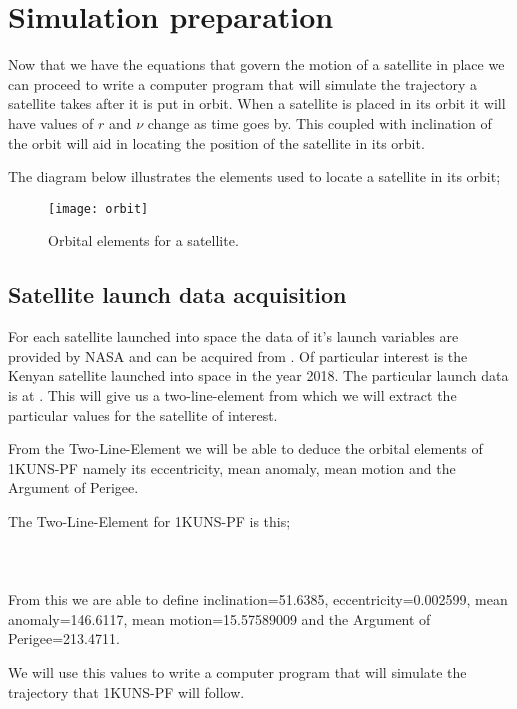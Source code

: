 \section{Simulation preparation}
Now that we have the equations that govern the motion of a satellite in place we can proceed to write a computer program that will simulate the trajectory a satellite takes after it is put in orbit. When a satellite is placed in its orbit it will have values of \(r\) and \(\nu\) change as time goes by. This coupled with inclination of the orbit will aid in locating the position of the satellite in its orbit.

The diagram below illustrates the elements used to locate a satellite in its orbit;
\begin{figure}[h]
	\centering
	\texttt{[image: orbit]}
	\caption{Orbital elements for a satellite.}
	\label{fig:six-orbital-elements}
\end{figure}

\subsection{Satellite launch data acquisition}
For each satellite launched into space the data of it's launch variables are provided by NASA and can be acquired from \textcite{http://celestrak.com}. Of particular interest is the Kenyan satellite launched into space in the year 2018. The particular launch data is at \textcite{http://celestrak.com/satcat/tle.php?CATNR=43467}. This will give us a two-line-element from which we will extract the particular values for the satellite of interest.

From the Two-Line-Element we will be able to deduce the orbital elements of 1KUNS-PF namely its eccentricity, mean anomaly, mean motion and the Argument of Perigee.


The Two-Line-Element for 1KUNS-PF is this;\\
\textcite{1KUNS-PF}\\              
\textcite{1 43467U 98067NQ  18290.48306199  .00009882  00000-0  13782-3 0  9995}\\
\textcite{2 43467  51.6385 126.6004 0002599 213.4711 146.6117 15.57589009 24750}\\

From this we are able to define inclination=51.6385, eccentricity=0.002599, mean anomaly=146.6117, mean motion=15.57589009 and the Argument of Perigee=213.4711.

We will use this values to write a computer program that will simulate the trajectory that 1KUNS-PF will follow.

